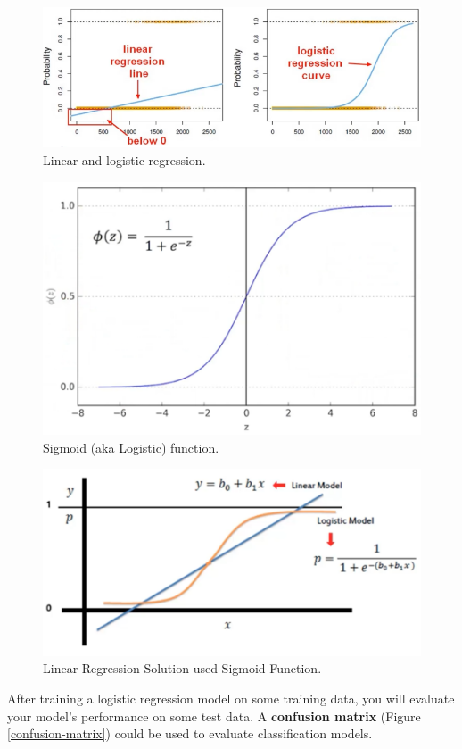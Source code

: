 \documentclass{article}
\begin{document}
\begin{figure}[H]
\centering
\includegraphics[width=\linewidth]{pic/linear-logistic_regression.png}
\caption{Linear and logistic regression.}
\end{figure}

\begin{figure}[H]
\centering
\includegraphics[width=.6\linewidth]{pic/sigmoid-function.png}
\caption{Sigmoid (aka Logistic) function.}
\label{sigmoid-function}
\end{figure}

\begin{figure}[H]
\centering
\includegraphics[width=.8\linewidth]{pic/linear_regression-sigmoid_function.png}
\caption{Linear Regression Solution used Sigmoid Function.}
\end{figure}

\par After training a logistic regression model on some training data, you will evaluate your model's performance on some test data. A {\bf{confusion matrix}} (Figure \ref{confusion-matrix}) could be used to evaluate classification models. 
\end{document}
